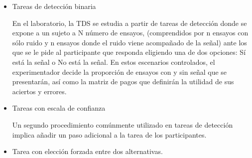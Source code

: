 \begin{itemize}
\item Tareas de detección binaria 

En el laboratorio, la  TDS se estudia a partir  de tareas de detección donde se expone a un  sujeto  a  N  número  de  ensayos,  (comprendidos  por  n  ensayos con  sólo  ruido  y  n  ensayos donde  el  ruido  viene  acompañado  de  la  señal)  ante  los  que  se  le  pide  al  participante  que responda eligiendo una de dos opciones: Sí está la señal o No está la señal. En estos escenarios controlados,  el  experimentador  decide  la  proporción  de  ensayos  con  y  sin  señal  que  se presentarán, así como la matriz de pagos que definirán la utilidad de sus aciertos y errores. \\


\item Tareas con escala de confianza

Un segundo procedimiento comúnmente utilizado en tareas de detección implica añadir un paso adicional a la tarea de los participantes. 

\parencite{McNicol}

\item Tarea con elección forzada entre dos alternativas.



\end{itemize}

